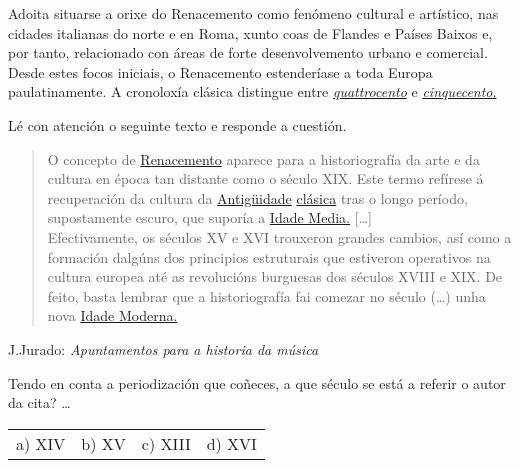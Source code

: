 %
%
%
Adoita situarse a orixe do Renacemento como fenómeno cultural e artístico, nas cidades italianas do norte e en Roma, xunto coas de Flandes e Países Baixos e, por tanto, relacionado con áreas de forte desenvolvemento urbano e comercial. Desde estes focos iniciais, o Renacemento estenderíase a toda Europa paulatinamente. A cronoloxía clásica distingue entre \href{http://es.wikipedia.org/wiki/Quattrocento}{\emph{quattrocento}} e \href{http://es.wikipedia.org/wiki/Cinquecento}{\emph{cinquecento}.}
%
\par
\vspace*{0.25cm}
%
\begin{ejercicio}
Lé con atención o seguinte texto e responde a cuestión.
    \begin{quote}
    O concepto de \href{http://es.wikipedia.org/wiki/Renacimiento}{Renacemento} aparece para a historiografía da arte e da cultura en época tan distante como o século XIX. Este termo refírese á recuperación da cultura da \href{http://es.wikipedia.org/wiki/Antig\%C3\%BCedad_cl\%C3\%A1sica}{Antigüidade} \href{http://es.wikipedia.org/wiki/Antig\%C3\%BCedad_cl\%C3\%A1sica}{clásica} tras o longo período, supostamente escuro, que suporía a \href{http://es.wikipedia.org/wiki/Edad_Media}{Idade Media.} [\ldots] \\
    Efectivamente, os séculos XV e XVI trouxeron grandes cambios, así como a formación dalgúns dos principios estruturais que estiveron operativos na cultura europea até as revolucións burguesas dos séculos XVIII e XIX. De feito, basta lembrar que a historiografía fai comezar no século (\ldots) unha nova \href{http://es.wikipedia.org/wiki/Edad_Moderna}{Idade Moderna.}
\end{quote}
\begin{flushright}
 J.Jurado: \textit{Apuntamentos para a historia da música}
\end{flushright}
%
Tendo en conta a periodización que coñeces, a que século se está a referir o autor da cita? \ldots
\par
\vspace*{0.15cm}
    \begin{tabular}{c c c c}
        a) XIV & b) XV & c) XIII & d) XVI  \\
    \end{tabular}

\end{ejercicio}
%

